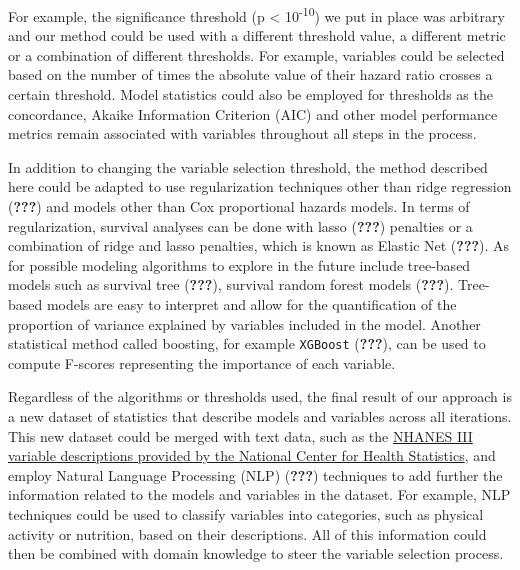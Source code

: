 \documentclass[12pt,twoside]{reedthesis}
\theoremstyle{definition}
\theoremstyle{definition}
\theoremstyle{definition}
\theoremstyle{remark}
\begin{document}
For example, the significance threshold (p \textless{}
10\textsuperscript{-10}) we put in place was arbitrary and our method
could be used with a different threshold value, a different metric or a
combination of different thresholds. For example, variables could be
selected based on the number of times the absolute value of their hazard
ratio crosses a certain threshold. Model statistics could also be
employed for thresholds as the concordance, Akaike Information Criterion
(AIC) and other model performance metrics remain associated with
variables throughout all steps in the process.

In addition to changing the variable selection threshold, the method
described here could be adapted to use regularization techniques other
than ridge regression ({\textbf{???}}) and models other than Cox
proportional hazards models. In terms of regularization, survival
analyses can be done with lasso ({\textbf{???}}) penalties or a
combination of ridge and lasso penalties, which is known as Elastic Net
({\textbf{???}}). As for possible modeling algorithms to explore in the
future include tree-based models such as survival tree ({\textbf{???}}),
survival random forest models ({\textbf{???}}). Tree-based models are
easy to interpret and allow for the quantification of the proportion of
variance explained by variables included in the model. Another
statistical method called boosting, for example \texttt{XGBoost}
({\textbf{???}}), can be used to compute F-scores representing the
importance of each variable.

Regardless of the algorithms or thresholds used, the final result of our
approach is a new dataset of statistics that describe models and
variables across all iterations. This new dataset could be merged with
text data, such as the
\href{https://wwwn.cdc.gov/nchs/nhanes/nhanes3/DataFiles.aspx}{NHANES
III variable descriptions provided by the National Center for Health
Statistics}, and employ Natural Language Processing (NLP)
({\textbf{???}}) techniques to add further the information related to
the models and variables in the dataset. For example, NLP techniques
could be used to classify variables into categories, such as physical
activity or nutrition, based on their descriptions. All of this
information could then be combined with domain knowledge to steer the
variable selection process.
\end{document}
